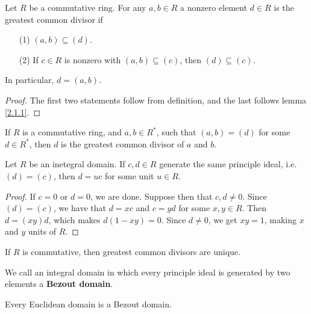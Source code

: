 \begin{lemma}\label{2.1.2}
    Let $R$ be a commutative ring. For any $a,b \in R$ a nonzero element  $d \in
    R$ is the greatest common divisor if
    \begin{enumerate}
        \item[(1)] $(a,b) \subseteq (d)$.

        \item[(2)] If $c \in R$ is nonzero with $(a,b) \subseteq (c)$, then $(d)
            \subseteq (c)$.
    \end{enumerate}
    In particular, $d=(a,b)$.
\end{lemma}
\begin{proof}
    The first two statements follow from definition, and the last follows lemma
    \ref{2.1.1}.
\end{proof}

\begin{lemma}\label{2.1.3}
    If $R$ is a commutative ring, and $a,b \in R^\ast$, such that  $(a,b)=(d)$
    for some $d \in R^\ast$, then $d$ is the greatest common divisor of $a$ and
     $b$.
\end{lemma}

\begin{lemma}\label{2.1.4}
    Let $R$ be an inetegral domain. If $c,d \in R$ generate the same principle
    ideal, i.e. $(d)=(c)$, then $d=uc$ for some unit  $u \in R$.
\end{lemma}
\begin{proof}
    If $c=0$ or  $d=0$, we are done. Suppose then that  $c,d \neq 0$. Since
    $(d)=(c)$, we have that $d=xc$ and $c=yd$ for some  $x,y \in R$. Then
    $d=(xy)d$, which makes $d(1-xy)=0$. Since $d \neq 0$, we get $xy=1$, making
     $x$ and $y$ units of $R$.
\end{proof}
\begin{corollary}
    If $R$ is commutative, then greatest common divisors are unique.
\end{corollary}

\begin{definition}
    We call an integral domain in which every principle ideal is generated by
    two elements a \textbf{Bezout domain}.
\end{definition}

\begin{lemma}\label{2.1.5}
    Every Euclidean domain is a Bezout domain.
\end{lemma}

